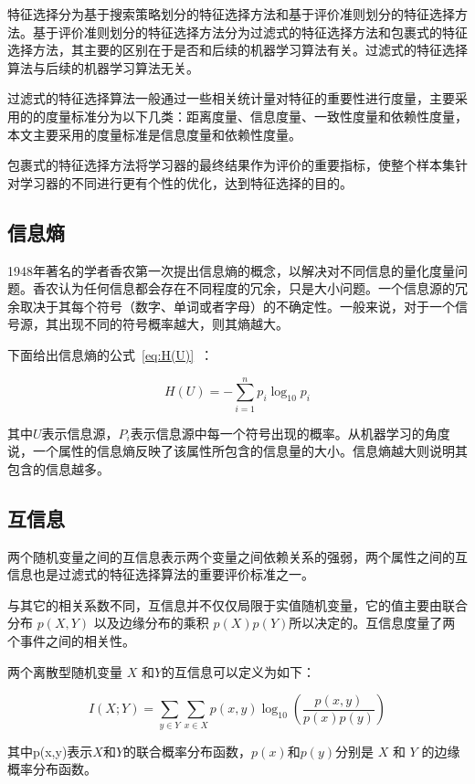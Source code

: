 特征选择分为基于搜索策略划分的特征选择方法和基于评价准则划分的特征选择方法。基于评价准则划分的特征选择方法分为过滤式的特征选择方法和包裹式的特征选择方法，其主要的区别在于是否和后续的机器学习算法有关。过滤式的特征选择算法与后续的机器学习算法无关。

过滤式的特征选择算法一般通过一些相关统计量对特征的重要性进行度量，主要采用的的度量标准分为以下几类：距离度量、信息度量、一致性度量和依赖性度量，本文主要采用的度量标准是信息度量和依赖性度量。

包裹式的特征选择方法将学习器的最终结果作为评价的重要指标，使整个样本集针对学习器的不同进行更有个性的优化，达到特征选择的目的。

\subsection{信息熵}
1948年著名的学者香农第一次提出信息熵的概念，以解决对不同信息的量化度量问题。香农认为任何信息都会存在不同程度的冗余，只是大小问题。一个信息源的冗余取决于其每个符号（数字、单词或者字母）的不确定性。一般来说，对于一个信号源，其出现不同的符号概率越大，则其熵越大。

下面给出信息熵的公式~\ref{eq:H(U)}~：

\begin{equation} \label{eq:H(U)}
H(U) =  -\sum_{i=1}^{n}p_i\log_{10}p_i
\end{equation}

其中$U$表示信息源，$P_i$表示信息源中每一个符号出现的概率。从机器学习的角度说，一个属性的信息熵反映了该属性所包含的信息量的大小。信息熵越大则说明其包含的信息越多。

\subsection{互信息}
两个随机变量之间的互信息表示两个变量之间依赖关系的强弱，两个属性之间的互信息也是过滤式的特征选择算法的重要评价标准之一。

与其它的相关系数不同，互信息并不仅仅局限于实值随机变量，它的值主要由联合分布 $p(X,Y)$ 以及边缘分布的乘积 $p(X)p(Y)$所以决定的。互信息度量了两个事件之间的相关性。

两个离散型随机变量 $X$ 和$Y$的互信息可以定义为如下：

\begin{equation} \label{eq:I(X;Y)1}
I(X;Y) =  \sum_{y\in Y}\sum_{x\in X}p(x,y)\log_{10}\left(\frac{p(x,y)}{p(x)p(y)}\right)
\end{equation}

其中p(x,y)表示$X$和$Y$的联合概率分布函数，$p(x)$和$p(y)$分别是 $X$ 和 $Y$ 的边缘概率分布函数。

